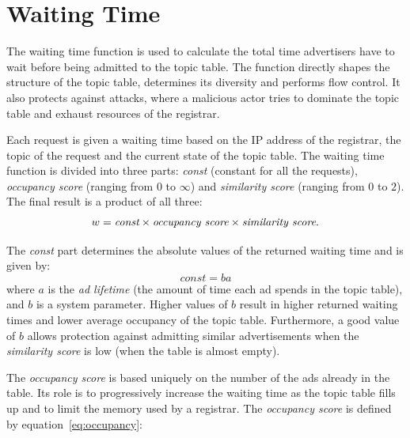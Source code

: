 \section{Waiting Time}
\label{sec:waitingTime}


The waiting time function is used to calculate the total time advertisers have to wait before being admitted to the topic table. 
The function directly shapes the structure of the topic table,  determines its diversity and performs flow control. 
It also protects against attacks, where a malicious actor tries to dominate the topic table and exhaust resources of the registrar. 

Each request is given a waiting time based on the IP address of the registrar, the topic of the request and the current state of the topic table. 
The waiting time function is divided into three parts: \emph{const} (constant
for all the requests), \emph{occupancy score} (ranging from $0$ to $\infty$)
and  \emph{similarity score} (ranging from $0$ to $2$). The final result is a
product of all three:
\begin{equation}
\label{eq:global}
w = \emph{const} \times \textit{occupancy score} \times \textit{similarity score}. 
\end{equation}

The \emph{const} part determines the absolute values of the returned waiting time and is given by:
\begin{equation}
\label{eq:const}
    \textit{const} = ba
\end{equation}
where $a$ is the \emph{ad lifetime} (the amount of time each ad spends in the
topic table), and $b$ is a system parameter. Higher values of $b$ result in
higher returned waiting times and lower average occupancy of the topic table.
Furthermore, a good value of $b$ allows protection against admitting similar advertisements when the \emph{similarity score} is low (\ie when the table is almost empty).

The \emph{occupancy score} is based uniquely on the number of the ads already in the table.
Its role is to progressively increase the waiting time as the topic table fills up and to limit the memory used by a registrar.
The \emph{occupancy score} is defined by equation~\ref{eq:occupancy}:

